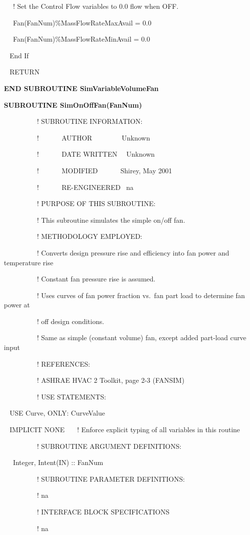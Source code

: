 ~~ ! Set the Control Flow variables to 0.0 flow when OFF.

~~ Fan(FanNum)\%MassFlowRateMaxAvail = 0.0

~~ Fan(FanNum)\%MassFlowRateMinAvail = 0.0

~ End If

~ RETURN

\textbf{END SUBROUTINE SimVariableVolumeFan}

\textbf{SUBROUTINE SimOnOffFan(FanNum)}

~~~~~~~~~ ! SUBROUTINE INFORMATION:

~~~~~~~~~ !~~~~~~ AUTHOR~~~~~~~~ Unknown

~~~~~~~~~ !~~~~~~ DATE WRITTEN~~ Unknown

~~~~~~~~~ !~~~~~~ MODIFIED~~~~~~ Shirey, May 2001

~~~~~~~~~ !~~~~~~ RE-ENGINEERED~ na

~~~~~~~~~ ! PURPOSE OF THIS SUBROUTINE:

~~~~~~~~~ ! This subroutine simulates the simple on/off fan.

~~~~~~~~~ ! METHODOLOGY EMPLOYED:

~~~~~~~~~ ! Converts design pressure rise and efficiency into fan power and temperature rise

~~~~~~~~~ ! Constant fan pressure rise is assumed.

~~~~~~~~~ ! Uses curves of fan power fraction vs.~fan part load to determine fan power at

~~~~~~~~~ ! off design conditions.

~~~~~~~~~ ! Same as simple (constant volume) fan, except added part-load curve input

~~~~~~~~~ ! REFERENCES:

~~~~~~~~~ ! ASHRAE HVAC 2 Toolkit, page 2-3 (FANSIM)

~~~~~~~~~ ! USE STATEMENTS:

~ USE Curve, ONLY: CurveValue

~ IMPLICIT NONE~~~ ! Enforce explicit typing of all variables in this routine

~~~~~~~~~ ! SUBROUTINE ARGUMENT DEFINITIONS:

~~ Integer, Intent(IN) :: FanNum

~~~~~~~~~ ! SUBROUTINE PARAMETER DEFINITIONS:

~~~~~~~~~ ! na

~~~~~~~~~ ! INTERFACE BLOCK SPECIFICATIONS

~~~~~~~~~ ! na

